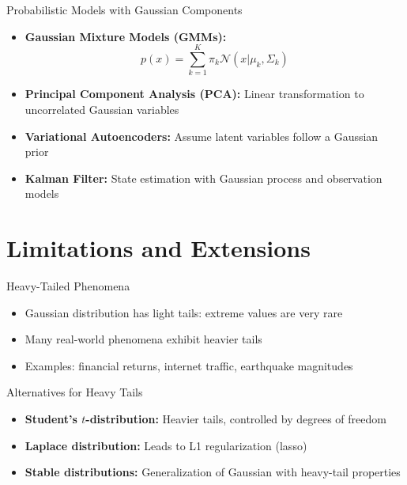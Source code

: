 \documentclass{beamer}
\begin{document}
\begin{frame}{Probabilistic Models with Gaussian Components}
  \begin{itemize}
    \item \textbf{Gaussian Mixture Models (GMMs):}
    \[
    p(x) = \sum_{k=1}^{K} \pi_k \mathcal{N}(x | \mu_k, \Sigma_k)
    \]
    
    \item \textbf{Principal Component Analysis (PCA):} Linear transformation to uncorrelated Gaussian variables
    
    \item \textbf{Variational Autoencoders:} Assume latent variables follow a Gaussian prior
    
    \item \textbf{Kalman Filter:} State estimation with Gaussian process and observation models
  \end{itemize}
\end{frame}

\section{Limitations and Extensions}

\begin{frame}{Heavy-Tailed Phenomena}
  \begin{itemize}
    \item Gaussian distribution has light tails: extreme values are very rare
    \item Many real-world phenomena exhibit heavier tails
    \item Examples: financial returns, internet traffic, earthquake magnitudes
  \end{itemize}
  
  \begin{block}{Alternatives for Heavy Tails}
    \begin{itemize}
      \item \textbf{Student's $t$-distribution:} Heavier tails, controlled by degrees of freedom
      \item \textbf{Laplace distribution:} Leads to L1 regularization (lasso)
      \item \textbf{Stable distributions:} Generalization of Gaussian with heavy-tail properties
    \end{itemize}
  \end{block}
\end{frame}
\end{document}
